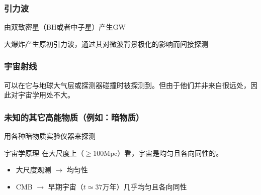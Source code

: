 \subsubsection{引力波}
\par 
由双致密星（BH或者中子星）产生GW
\par
大爆炸产生原初引力波，通过其对微波背景极化的影响而间接探测

\subsubsection{宇宙射线}
\par 
可以在它与地球大气层或探测器碰撞时被探测到。但由于他们并非来自很远处，因此对宇宙学用处不大。

\subsubsection{未知的其它高能物质（例如：暗物质）}
\par 
用各种暗物质实验仪器来探测

\begin{cbox}[red]{宇宙学原理}
	在大尺度上（$\geqslant 100 \mathrm{Mpc}$）看，宇宙是均匀且各向同性的。
	\begin{itemize}
		\item 大尺度观测 $\rightarrow$ 均匀性
		\item CMB $\rightarrow$ 早期宇宙（$t \simeq 37 \text{万年}$）几乎均匀且各向同性
	\end{itemize}
\end{cbox}